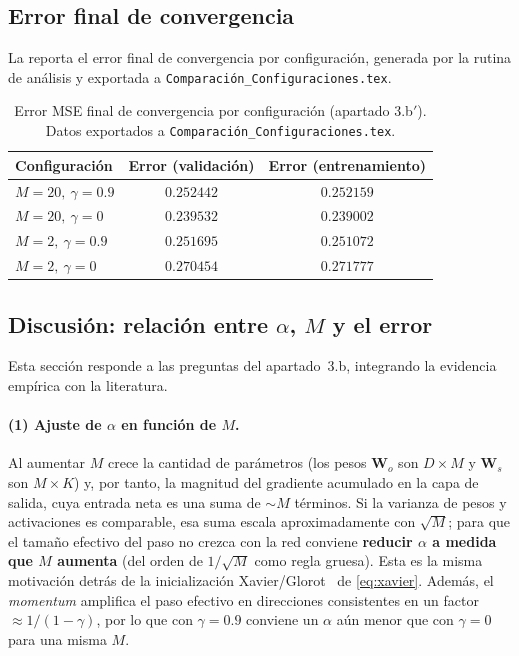 \documentclass[11pt,a4paper]{article}
\begin{document}
\subsection{Error final de convergencia}

La  reporta el error final de convergencia por configuración,
generada por la rutina de análisis y exportada a
\texttt{Comparación\_Configuraciones.tex}.

\begin{table}[H]
\centering
\caption{Error MSE final de convergencia por configuración (apartado 3.b$'$).
Datos exportados a \texttt{Comparación\_Configuraciones.tex}.}
\label{tab:r2-final}
\begin{tabular}{@{}lcc@{}}
\toprule
Configuración & Error (validación) & Error (entrenamiento)\\
\midrule
$M=20,\ \gamma=0.9$ & $0.252442$ & $0.252159$\\
$M=20,\ \gamma=0$   & $0.239532$ & $0.239002$\\
$M=2,\ \gamma=0.9$  & $0.251695$ & $0.251072$\\
$M=2,\ \gamma=0$    & $0.270454$ & $0.271777$\\
\bottomrule
\end{tabular}
\end{table}

\subsection{Discusión: relación entre \texorpdfstring{$\alpha$}{alpha},
\texorpdfstring{$M$}{M} y el error}\label{sec:disc-r2}

Esta sección responde a las preguntas del apartado~3.b, integrando la evidencia
empírica con la literatura.

\paragraph{(1) Ajuste de $\alpha$ en función de $M$.}
Al aumentar $M$ crece la cantidad de parámetros (los pesos $\mathbf{W}_o$ son
$D\times M$ y $\mathbf{W}_s$ son $M\times K$) y, por tanto, la magnitud del
gradiente acumulado en la capa de salida, cuya entrada neta es una suma de $\sim
M$ términos. Si la varianza de pesos y activaciones es comparable, esa suma
escala aproximadamente con $\sqrt{M}$; para que el tamaño efectivo del paso no
crezca con la red conviene \textbf{reducir $\alpha$ a medida que $M$ aumenta}
(del orden de $1/\sqrt{M}$ como regla gruesa). Esta es la misma motivación
detrás de la inicialización Xavier/Glorot~\cite{glorot2010} de
\cref{eq:xavier}. Además, el \emph{momentum} amplifica el paso efectivo en
direcciones consistentes en un factor $\approx 1/(1-\gamma)$, por lo que con
$\gamma=0.9$ conviene un $\alpha$ aún menor que con $\gamma=0$ para una misma
$M$.
\end{document}
